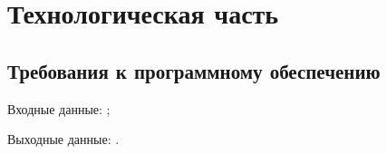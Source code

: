 \chapter{Технологическая часть}


\section{Требования к программному обеспечению}

Входные данные: ;

Выходные данные: .



\clearpage